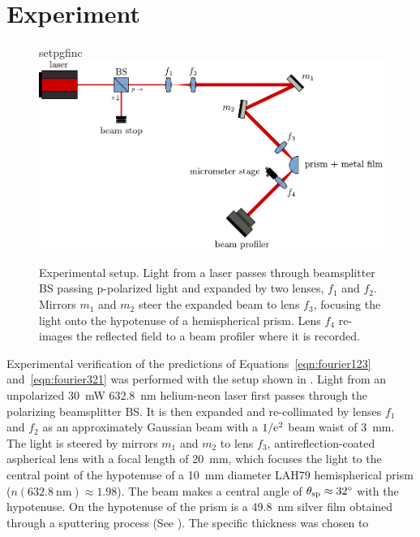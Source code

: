 \section{Experiment}\label{sec:intexperimental}
\begin{figure}[ht]
  \centering
  {setpgfinc}
  \includegraphics[keepaspectratio,width=14cm]{interference/figures/opticalsetup.pdf}
  \caption{Experimental setup.  Light from a laser passes through beamsplitter
    BS passing p-polarized light and expanded by two lenses, $f_1$ and $f_2$.
    Mirrors $m_1$ and $m_2$ steer the expanded beam to lens $f_3$, focusing the
    light onto the hypotenuse of a hemispherical prism.  Lens $f_4$ re-images the reflected field to a beam profiler where it is recorded.}
  \label{fig:opticalsetup}
\end{figure}
Experimental verification of the predictions of Equations~\ref{eqn:fourier123}
and~\ref{eqn:fourier321} was performed with the setup shown in
.  Light from an
unpolarized \SI{30}{\milli\watt} \SI{632.8}{\nano\meter} helium-neon
laser first passes through the polarizing
beamsplitter BS\@.  It is then expanded and re-collimated by lenses $f_1$ and $f_2$ as an
approximately Gaussian beam with a $1/{\mathrm{e}}^2$ beam waist of
\SI{3}{\milli\meter}. The light is steered by mirrors $m_1$ and $m_2$ to
lens $f_3$, antireflection-coated aspherical lens with a focal length of
\SI{20}{\milli\meter}, which
focuses the light to the central point of the hypotenuse of a
\SI{10}{\milli\meter} diameter LAH79 hemispherical prism
($n(\SI{632.8}{\nano\meter})\approx1.98$).  The beam makes a central angle
of $\theta_\mathrm{sp}\approx\SI{32}{\degree}$ with the hypotenuse.
On the hypotenuse of the prism is a \SI{49.8}{\nano\meter} silver film
obtained through a sputtering process (See ).
The specific thickness was chosen to
